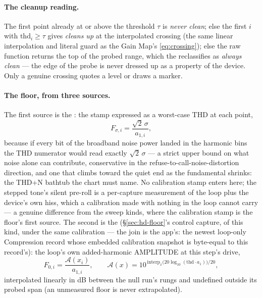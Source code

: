 \documentclass[11pt,a4paper]{article}
\begin{document}
\paragraph{The cleanup reading.} The first point already at or above the
threshold $\tau$ is \emph{never clean}; else the first $i$ with
$\mathrm{thd}_i \ge \tau$ gives \emph{cleans up} at the interpolated
crossing (the same linear interpolation and literal guard as the Gain
Map's \eqref{eq:crossing}); else the
raw function returns the top of the probed range, which the
 reclassifies as \emph{always clean} --- the edge
of the probe is never dressed up as a property of the device. Only a
genuine crossing quotes a level or draws a marker.

\paragraph{The floor, from three sources.}
The first source is the : the stamp expressed as a
worst-case THD at each point,
\begin{equation}
  F_{\sigma,i} = \frac{\sqrt2\,\sigma}{a_{1,i}},
  \label{eq:noisebound}
\end{equation}
because if every bit of the broadband noise power landed in the harmonic
bins the THD numerator would read exactly $\sqrt2\,\sigma$ --- a strict
upper bound on what noise alone can contribute, conservative in the
refuse-to-call-noise-distortion direction, and one that climbs toward the
quiet end as the fundamental shrinks: the THD+N bathtub the chart must
name. No calibration stamp enters here; the stepped tone's silent
pre-roll is a per-capture measurement of the loop plus the device's own
hiss, which a calibration made with nothing in the loop cannot carry ---
a genuine difference from the sweep kinds, where the calibration stamp
is the floor's first source. The second is the 
(\S\ref{sec:hd-floor}'s control capture, of this kind, under the same
calibration --- the join is the app's: the newest loop-only Compression
record whose embedded calibration snapshot is byte-equal to this
record's): the loop's own added-harmonic AMPLITUDE at this step's drive,
\begin{equation}
  F_{0,i} = \frac{\mathcal{A}(x_i)}{a_{1,i}},\qquad
  \mathcal{A}(x) = 10^{\,\mathrm{interp}_x\big(20\log_{10}(\mathrm{thd}\cdot a_1)\big)/20},
  \label{eq:nullrun}
\end{equation}
interpolated linearly in dB between the null run's rungs and undefined
outside its probed span (an unmeasured floor is never extrapolated).
\end{document}
